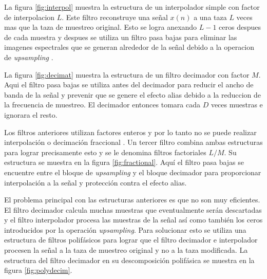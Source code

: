 La figura \ref{fig:interpol} muestra la estructura de un interpolador simple con factor de
interpolacion $L$. Este filtro reconstruye una se\~nal $x(n)$ a una taza $L$ veces mas que la taza
de muestreo original. Esto se logra anexando $L-1$ ceros despues de cada muestra y despues se
utiliza un filtro pasa bajas para eliminar las imagenes espectrales que se generan alrededor de la
se\~nal debido a la operacion de \emph{upsampling} \cite{behrouz}.

La figura \ref{fig:decimat} muestra la estructura de un filtro decimador con factor $M$. Aqui el
filtro pasa bajas se utiliza antes del decimador para reducir el ancho de banda de la se\~nal y
prevenir que se genere el efecto alias debido a la reduccion de la frecuencia de muestreo. El
decimador entonces tomara cada $D$ veces muestras e ignorara el resto.

Los filtros anteriores utilizan factores enteros y por lo tanto no se puede realizar interpolaci\'on
o decimaci\'on fraccional \cite{behrouz}. Un tercer filtro combina ambas estructuras para lograr precisamente esto y
se le denomina filtros factoriales $L/M$. Su estructura se muestra en la figura
\ref{fig:fractional}. Aqu\'i el filtro pasa bajas se encuentre entre el bloque de \emph{upsampling} y
el bloque decimador para proporcionar interpolaci\'on a la se\~nal y protecci\'on contra el efecto
alias.

El problema principal con las estructuras anteriores es que no son muy eficientes. El filtro decimador calcula
muchas muestras que eventualmente ser\'an descartadas y el filtro interpolador procesa las muestras de
la se\~nal as\'i como tambi\'en los ceros introducidos por la operaci\'on \emph{upsampling}. Para
solucionar esto se utiliza una estructura de filtros polif\'asicos para lograr que el filtro decimador
e interpolador procesen la se\~nal a la taza de muestreo original y no a la taza modificada. La
estructura del filtro decimador en su descomposici\'on polif\'asica se muestra en la figura
\ref{fig:polydecim}.

